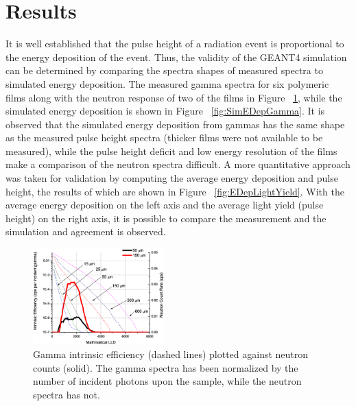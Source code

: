 \documentclass{anstrans}
\newcommand{\figurewidth}{0.45\textwidth}
\begin{document}
\section{Results}
It is well established that the pulse height of a radiation event is proportional to the energy deposition of the event\cite{birks_scintillations_1951}.
Thus, the validity of the GEANT4 simulation can be determined by comparing the spectra shapes of measured spectra to simulated energy deposition.
The measured gamma spectra for six polymeric films along with the neutron response of two of the films in Figure ~\ref{fig:GammaIntrNeutronCounts}, while the simulated energy deposition is shown in Figure ~\ref{fig:SimEDepGamma}.
It is observed that the simulated energy deposition from gammas has the same shape as the measured pulse height spectra (thicker films were not available to be measured), while the pulse height deficit and low energy resolution of the films make a comparison of the neutron spectra difficult.
A more quantitative approach was taken for validation by computing the average energy deposition and pulse height, the results of which are shown in Figure ~\ref{fig:EDepLightYield}. 
With the average energy deposition on the left axis and the average light yield (pulse height) on the right axis, it is possible to compare the measurement and the simulation and agreement is observed.
\begin{figure}[h]
    \centering
    \includegraphics[width=\figurewidth]{PS_IntEff_LiF20_PPO5}
    \caption{Gamma intrinsic efficiency (dashed lines) plotted against neutron counts (solid). The gamma spectra has been normalized by the number of incident photons upon the sample, while the neutron spectra has not.}
    \label{fig:GammaIntrNeutronCounts}
\end{figure}
\end{document}
